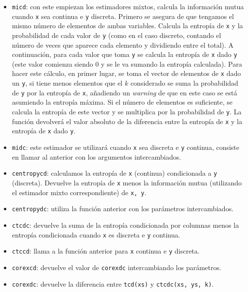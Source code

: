 \documentclass[10pt,a4paper]{article} %
\theoremstyle{definition}
\begin{document}
\begin{itemize}
\item \texttt{micd}: con este empiezan los estimadores mixtos, calcula la información mutua cuando \texttt{x} sea continua e \texttt{y} discreta. Primero se asegura de que tengamos el mismo número de elementos de ambas variables. Calcula la entropía de \texttt{x} y la probabilidad de cada valor de \texttt{y} (como en el caso discreto, contando el número de veces que aparece cada elemento y dividiendo entre el total). A continuación, para cada valor que toma \texttt{y} se calcula la entropía de \texttt{x} dado \texttt{y} (este valor comienza siendo 0 y se le va sumando la entropía calculada). Para hacer este cálculo, en primer lugar, se toma el vector de elementos de \texttt{x} dado un \texttt{y}, si tiene menos elementos que el $k$ considerado se suma la probabilidad de \texttt{y} por la entropía de \texttt{x}, añadiendo un \textit{warning} de que en este caso se está asumiendo la entropía máxima. Si el número de elementos es suficiente, se calcula la entropía de este vector y se multiplica por la probabilidad de \texttt{y}. La función devolverá el valor absoluto de la diferencia entre la entropía de \texttt{x} y la entropía de \texttt{x} dado \texttt{y}.

\item \texttt{midc}: este estimador se utilizará cuando \texttt{x} sea discreta e \texttt{y} continua, consiste en llamar al anterior con los argumentos intercambiados.

\item \texttt{centropycd}: calculamos la entropía de \texttt{x} (continua) condicionada a \texttt{y} (discreta). Devuelve la entropía de \texttt{x} menos la información mutua (utilizando el estimador mixto correspondiente) de \texttt{x, y}.

\item \texttt{centropydc}: utiliza la función anterior con los parámetros intercambiados.

\item \texttt{ctcdc}: devuelve la suma de la entropía condicionada por columnas menos la entropía condicionada cuando \texttt{x} es discreta e \texttt{y} continua.

\item \texttt{ctccd}: llama a la función anterior para \texttt{x} continua e \texttt{y} discreta.

\item \texttt{corexcd}: devuelve el valor de \texttt{corexdc} intercambiando los parámetros.

\item \texttt{corexdc}: devuelve la diferencia entre \texttt{tcd(xs)} y \texttt{ctcdc(xs, ys, k)}.


\end{itemize}
\end{document}

